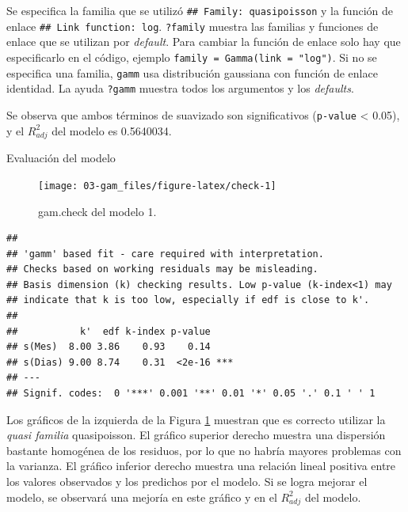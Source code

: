 \documentclass[
]{book}
\newenvironment{Shaded}{\begin{snugshade}}{\end{snugshade}}
\newcommand{\AttributeTok}[1]{\textcolor[rgb]{0.77,0.63,0.00}{#1}}
\newcommand{\DecValTok}[1]{\textcolor[rgb]{0.00,0.00,0.81}{#1}}
\newcommand{\FunctionTok}[1]{\textcolor[rgb]{0.00,0.00,0.00}{#1}}
\newcommand{\NormalTok}[1]{#1}
\newcommand{\SpecialCharTok}[1]{\textcolor[rgb]{0.00,0.00,0.00}{#1}}
\newcommand{\StringTok}[1]{\textcolor[rgb]{0.31,0.60,0.02}{#1}}
\begin{document}
Se especifica la familia que se utilizó \texttt{\#\#\ Family:\ quasipoisson} y la función de enlace \texttt{\#\#\ Link\ function:\ log}. \texttt{?family} muestra las familias y funciones de enlace que se utilizan por \emph{default}. Para cambiar la función de enlace solo hay que especificarlo en el código, ejemplo \texttt{family\ =\ Gamma(link\ =\ "log")}. Si no se especifica una familia, \texttt{gamm} usa distribución gaussiana con función de enlace identidad. La ayuda \texttt{?gamm} muestra todos los argumentos y los \emph{defaults}.

Se observa que ambos términos de suavizado son significativos (\texttt{p-value} \textless{} 0.05), y el \(R_{adj}^{2}\) del modelo es 0.5640034.

Evaluación del modelo

\begin{Shaded}
\end{Shaded}

\begin{figure}

{\centering \texttt{[image: 03-gam\_files/figure-latex/check-1]} 

}

\caption{gam.check del modelo 1.}\label{fig:check}
\end{figure}

\begin{verbatim}
## 
## 'gamm' based fit - care required with interpretation.
## Checks based on working residuals may be misleading.
## Basis dimension (k) checking results. Low p-value (k-index<1) may
## indicate that k is too low, especially if edf is close to k'.
## 
##           k'  edf k-index p-value    
## s(Mes)  8.00 3.86    0.93    0.14    
## s(Dias) 9.00 8.74    0.31  <2e-16 ***
## ---
## Signif. codes:  0 '***' 0.001 '**' 0.01 '*' 0.05 '.' 0.1 ' ' 1
\end{verbatim}

Los gráficos de la izquierda de la Figura \ref{fig:check} muestran que es correcto utilizar la \emph{quasi familia} quasipoisson. El gráfico superior derecho muestra una dispersión bastante homogénea de los residuos, por lo que no habría mayores problemas con la varianza. El gráfico inferior derecho muestra una relación lineal positiva entre los valores observados y los predichos por el modelo. Si se logra mejorar el modelo, se observará una mejoría en este gráfico y en el \(R_{adj}^{2}\) del modelo.
\end{document}
